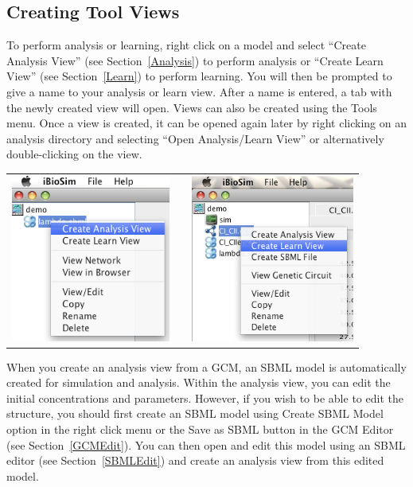 \documentclass[titlepage,11pt]{article}
\begin{document}
\subsection{Creating Tool Views}

\noindent
To perform analysis or learning, right click on a model and
select ``Create Analysis View'' (see Section~\ref{Analysis})
to perform analysis or ``Create Learn View'' (see Section~\ref{Learn})
to perform learning. You will then be prompted to give a name to
your analysis or learn view. After a name is entered, a tab with
the newly created view will open.  Views can also be created using the
Tools menu.  Once a view is created, it can
be opened again later by right clicking on an analysis directory
and selecting ``Open Analysis/Learn View'' or alternatively
double-clicking on the view.
\begin{center}
\begin{tabular}{ccc}
\includegraphics[height=55mm]{screenshots/createAnalysis} & & 
\includegraphics[height=55mm]{screenshots/createLearn}
\end{tabular}
\end{center}

When you create an analysis view from a GCM, an SBML model is
automatically created for simulation and analysis. Within the
analysis view, you can edit the initial concentrations and
parameters. However, if you wish to be able to edit the
structure, you should first create an SBML model using Create
SBML Model option in the right click menu or the Save as SBML button in
the GCM Editor (see Section~\ref{GCMEdit}).  You can then open and
edit this model using an SBML editor (see Section~\ref{SBMLEdit}) and
create an analysis view from this edited model.
\end{document}
